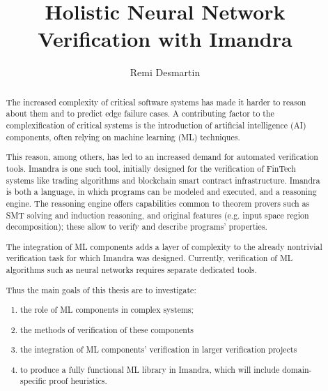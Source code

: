 \documentclass[]{article}
\title{Holistic Neural Network Verification with Imandra}
\author{Remi Desmartin}
\begin{document}
\maketitle

\begin{abstract}


The increased complexity of critical software systems has made it harder to reason about them and to predict edge failure cases.
A contributing factor to the complexification of critical systems is the introduction of artificial intelligence (AI) components, often relying on machine learning (ML) techniques.

This reason, among others, has led to an increased demand for automated verification tools. Imandra is one such tool, initially designed for the verification of FinTech systems like trading algorithms and blockchain smart contract infrastructure. Imandra is both a language, in which programs can be modeled and executed, and a reasoning engine.
The reasoning engine offers capabilities common to theorem provers such as SMT solving and induction reasoning, and original features (e.g. input space region decomposition); these allow to verify and describe programs' properties.

The integration of ML components adds a layer of complexity to the already nontrivial verification task for which Imandra was designed. Currently, verification of ML algorithms such as neural networks requires separate dedicated tools.

Thus the main goals of this thesis are to investigate:

\begin{enumerate}
\item the role of ML components in complex systems;

\item the methods of verification of these components

\item the integration of ML components' verification in larger verification projects

\item to produce a fully functional ML library in Imandra, which will include domain-specific proof heuristics.



	
\end{enumerate}

\end{abstract}

\iffalse
\end{document}
